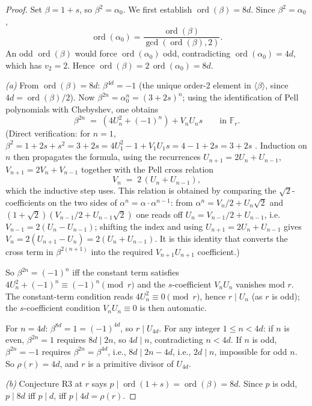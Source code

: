 \documentclass[11pt]{amsart}
\theoremstyle{plain}
\theoremstyle{definition}
\theoremstyle{remark}
\numberwithin{equation}{section}
\newcommand{\ord}{\operatorname{ord}}
\newcommand{\F}{\mathbb{F}}
\begin{document}
\begin{proof}
Set $\beta=1+s$, so $\beta^2=\alpha_0$. We first establish $\ord(\beta) = 8 d$. Since $\beta^2 = \alpha_0$,
\[
  \ord(\alpha_0) = \frac{\ord(\beta)}{\gcd(\ord(\beta), 2)}.
\]
An odd $\ord(\beta)$ would force $\ord(\alpha_0)$ odd, contradicting $\ord(\alpha_0) = 4 d$, which has $v_2 = 2$. Hence $\ord(\beta) = 2\,\ord(\alpha_0) = 8 d$.

\emph{(a)} From $\ord(\beta) = 8 d$: $\beta^{4 d} = -1$ (the unique order-2 element in $\langle\beta\rangle$, since $4 d = \ord(\beta)/2$). Now $\beta^{2n} = \alpha_0^n = (3 + 2 s)^n$; using the identification of Pell polynomials with Chebyshev, one obtains
\[
  \beta^{2n} \;=\; (4 U_n^2 + (-1)^n) + V_n U_n s \qquad\text{in } \F_r.
\]
(Direct verification: for $n = 1$, $\beta^2 = 1 + 2s + s^2 = 3 + 2s = 4 U_1^2 - 1 + V_1 U_1 s = 4 - 1 + 2 s = 3 + 2 s$ \checkmark. Induction on $n$ then propagates the formula, using the recurrences $U_{n+1} = 2 U_n + U_{n-1}$, $V_{n+1} = 2 V_n + V_{n-1}$ together with the Pell cross relation
\[
  V_n \;=\; 2\,(U_n + U_{n-1}),
\]
which the inductive step uses. This relation is obtained by comparing the $\sqrt 2$-coefficients on the two sides of $\alpha^{n} = \alpha \cdot \alpha^{n-1}$: from $\alpha^{n} = V_{n}/2 + U_{n}\sqrt 2$ and $(1+\sqrt 2)(V_{n-1}/2 + U_{n-1}\sqrt 2)$ one reads off $U_{n} = V_{n-1}/2 + U_{n-1}$, i.e. $V_{n-1} = 2(U_{n} - U_{n-1})$; shifting the index and using $U_{n+1} = 2 U_n + U_{n-1}$ gives $V_{n} = 2(U_{n+1} - U_{n}) = 2(U_n + U_{n-1})$. It is this identity that converts the cross term in $\beta^{2(n+1)}$ into the required $V_{n+1} U_{n+1}$ coefficient.)

So $\beta^{2 n} = (-1)^n$ iff the constant term satisfies $4 U_n^2 + (-1)^n \equiv (-1)^n \pmod r$ and the $s$-coefficient $V_n U_n$ vanishes mod $r$. The constant-term condition reads $4 U_n^2 \equiv 0 \pmod r$, hence $r \mid U_n$ (as $r$ is odd); the $s$-coefficient condition $V_n U_n \equiv 0$ is then automatic.

For $n = 4 d$: $\beta^{8 d} = 1 = (-1)^{4 d}$, so $r \mid U_{4 d}$. For any integer $1 \leq n < 4 d$: if $n$ is even, $\beta^{2 n} = 1$ requires $8 d \mid 2 n$, so $4 d \mid n$, contradicting $n < 4 d$. If $n$ is odd, $\beta^{2 n} = -1$ requires $\beta^{2 n} = \beta^{4 d}$, i.e., $8 d \mid 2 n - 4 d$, i.e., $2 d \mid n$, impossible for odd $n$. So $\rho(r) = 4 d$, and $r$ is a primitive divisor of $U_{4 d}$.

\emph{(b)} Conjecture R3 at $r$ says $p \mid \ord(1 + s) = \ord(\beta) = 8 d$. Since $p$ is odd, $p \mid 8 d$ iff $p \mid d$, iff $p \mid 4 d = \rho(r)$.
\end{proof}
\end{document}
